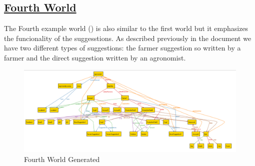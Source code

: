 	\FloatBarrier
	\newpage
	\subsection[Fourth]{\hyperlink{toc}{Fourth World}}
	The Fourth example world () is also similar to the first world but it emphasizes the funcionality of the suggesstions. As described previously in the document we have two different types of suggestions: the farmer suggestion so written by a farmer and the direct suggestion written by an agronomist.
	
	\begin{figure}[h!]
		\centering
		\includegraphics[scale=0.5, angle=90]{Files/alloy/world4.png}
		\caption{\label{fig:fourthWorld}Fourth World Generated}
	\end{figure}
	